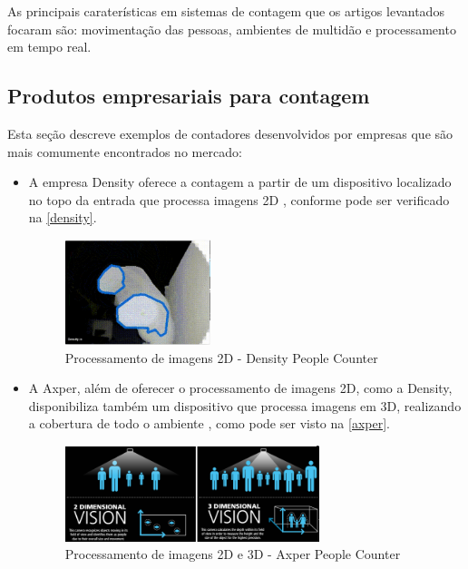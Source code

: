   As principais caraterísticas em sistemas de contagem que os artigos levantados focaram são: movimentação das pessoas, ambientes de multidão e processamento em tempo real.

\subsection{Produtos empresariais para contagem}
\label{produtos-empresas}
Esta seção descreve exemplos de contadores desenvolvidos por empresas que são mais comumente encontrados no mercado:

\begin{itemize}
\item A empresa Density oferece a contagem a partir de um
dispositivo localizado no topo da entrada que processa imagens 2D \cite{Density2017}, conforme pode ser verificado na \autoref{density}.

\begin{figure}[htb]
  \caption{\label{density}Processamento de imagens 2D - Density People Counter}
  \begin{center}
    \includegraphics[width=0.40\textwidth]{img/density.png}
  \end{center}
\end{figure}

\item A Axper, além de oferecer o processamento de imagens 2D, como a Density, disponibiliza também um dispositivo que processa imagens em 3D, realizando a cobertura de todo o ambiente \cite{Axper2017}, como pode ser visto na \autoref{axper}.

\begin{figure}[htb]
  \caption{\label{axper}Processamento de imagens 2D e 3D - Axper People Counter}
  \begin{center}
    \includegraphics[width=0.70\textwidth]{img/axper.png}
  \end{center}
\end{figure}


\end{itemize}
